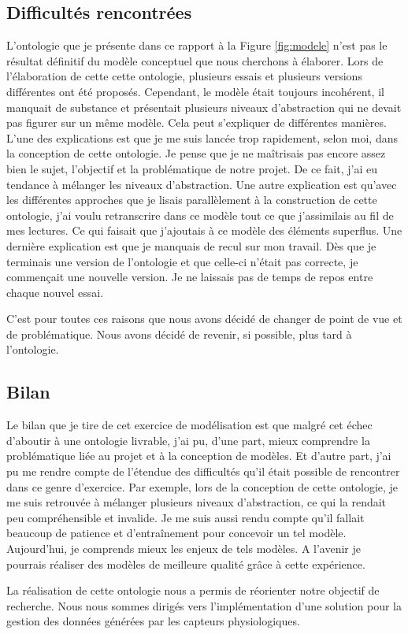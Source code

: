 \documentclass[11pt]{article}
\begin{document}
	\subsection{Difficultés rencontrées}\label{sec:difficultes}
		L'ontologie que je présente dans ce rapport à la Figure \ref{fig:modele} n'est pas le résultat définitif du modèle conceptuel que nous cherchons à élaborer.
		Lors de l'élaboration de cette cette ontologie, plusieurs essais et plusieurs versions différentes ont été proposés.
		Cependant, le modèle était toujours incohérent, il manquait de substance et présentait plusieurs niveaux d'abstraction qui ne devait pas figurer sur un même modèle. 
		Cela peut s'expliquer de différentes manières. 
		L'une des explications est que je me suis lancée trop rapidement, selon moi, dans la conception de cette ontologie.
		Je pense que je ne maîtrisais pas encore assez bien le sujet, l'objectif et la problématique de notre projet.
		De ce fait, j'ai eu tendance à mélanger les niveaux d'abstraction.
		Une autre explication est qu'avec les différentes approches que je lisais parallèlement à la construction de cette ontologie, j'ai voulu retranscrire dans ce modèle tout ce que j'assimilais au fil de mes lectures.
		Ce qui faisait que j'ajoutais à ce modèle des éléments superflus.
		Une dernière explication est que je manquais de recul sur mon travail.
		Dès que je terminais une version de l'ontologie et que celle-ci n'était pas correcte, je commençait une nouvelle version.
		Je ne laissais pas de temps de repos entre chaque nouvel essai.\par
		C'est pour toutes ces raisons que nous avons décidé de changer de point de vue et de problématique.
		Nous avons décidé de revenir, si possible, plus tard à l'ontologie.
	\subsection{Bilan}\label{sec:modelbilan}
		Le bilan que je tire de cet exercice de modélisation est que malgré cet échec d'aboutir à une ontologie livrable, j'ai pu, d'une part, mieux comprendre la problématique liée au projet et à la conception de modèles.
		Et d'autre part, j'ai pu me rendre compte de l'étendue des difficultés qu'il  était possible de rencontrer dans ce genre d'exercice.
		Par exemple, lors de la conception de cette ontologie, je me suis retrouvée à mélanger plusieurs niveaux d'abstraction, ce qui la rendait peu compréhensible et invalide.
		Je me suis aussi rendu compte qu'il fallait beaucoup de patience et d'entraînement pour concevoir un tel modèle.
		Aujourd'hui, je comprends mieux les enjeux de tels modèles.
		A l'avenir je pourrais réaliser des modèles de meilleure qualité grâce à cette expérience.\par
		La réalisation de cette ontologie nous a permis de réorienter notre objectif de recherche.
		Nous nous sommes dirigés vers l'implémentation d'une solution pour la gestion des données générées par les capteurs physiologiques.
\end{document}
